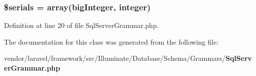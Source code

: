 \subsubsection[{\$serials}]{\setlength{\rightskip}{0pt plus 5cm}\$serials = array(\textquotesingle{}big\+Integer\textquotesingle{}, \textquotesingle{}integer\textquotesingle{})\hspace{0.3cm}{\ttfamily [protected]}}\label{class_illuminate_1_1_database_1_1_schema_1_1_grammars_1_1_sql_server_grammar_a151ecd4bab2e85de938891e925a040c2}


Definition at line 20 of file Sql\+Server\+Grammar.\+php.



The documentation for this class was generated from the following file\+:\begin{DoxyCompactItemize}
\item 
vendor/laravel/framework/src/\+Illuminate/\+Database/\+Schema/\+Grammars/{\bf Sql\+Server\+Grammar.\+php}\end{DoxyCompactItemize}
